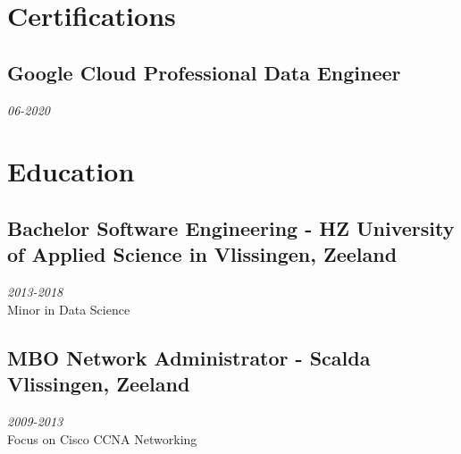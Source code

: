 \documentclass{article}
\begin{document}
\clearpage

\section{Certifications}
\subsection{Google Cloud Professional Data Engineer}\hfill {\em 06-2020} \\


\section{Education}
\subsection{Bachelor Software Engineering - HZ University of Applied Science in Vlissingen, Zeeland}\hfill {\em 2013-2018} \\
Minor in Data Science
\subsection{MBO Network Administrator - Scalda Vlissingen, Zeeland}\hfill {\em 2009-2013} \\
Focus on Cisco CCNA Networking
\end{document}
